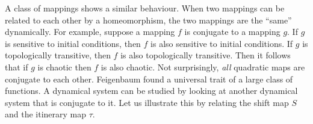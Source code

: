 \documentclass[11pt]{article}
\begin{document}
A class of mappings shows a similar behaviour.
When two mappings can be related to each other by a homeomorphism,
the two mappings are the ``same'' dynamically.
For example, suppose a mapping $f$ is conjugate to a mapping $g$.
If $g$ is sensitive to initial conditions, then $f$ is also sensitive
to initial conditions.
If $g$ is topologically transitive, then $f$ is also topologically transitive.
Then it follows that if $g$ is chaotic then $f$ is also chaotic.
Not surprisingly, {\it all} quadratic maps are conjugate to each other.
Feigenbaum found a universal trait of a large class of functions.
A dynamical system can be studied by looking at another dynamical system
that is conjugate to it.
Let us illustrate this by relating the shift map $S$ and the itinerary map $\tau$.
\end{document}
